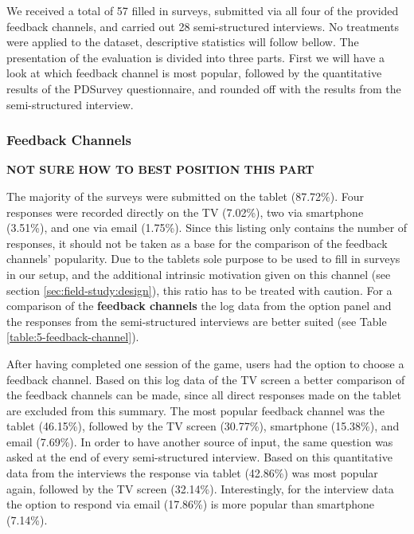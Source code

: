 	We received a total of 57 filled in surveys, submitted via all four of the provided feedback channels, and carried out 28 semi-structured interviews. 
	No treatments were applied to the dataset, descriptive statistics will follow bellow. The presentation of the evaluation is divided into three parts. First we will have a look at which feedback channel is most popular, followed by the quantitative results of the PDSurvey questionnaire, and rounded off with the results from the semi-structured interview. 



	\subsubsection{Feedback Channels}
	\label{5:results:feedback-channels}
	\label{5:results:feedback-channel}

	\textbf{NOT SURE HOW TO BEST POSITION THIS PART}

	The majority of the surveys were submitted on the tablet (87.72\%). Four responses were recorded directly on the TV (7.02\%), two via smartphone (3.51\%), and one via email (1.75\%). Since this listing only contains the number of responses, it should not be taken as a base for the comparison of the feedback channels' popularity. %
	Due to the tablets sole purpose to be used to fill in surveys in our setup, and the additional intrinsic motivation given on this channel (see section \ref{sec:field-study:design}), this ratio has to be treated with caution. For a comparison of the \textbf{feedback channels} the log data from the option panel and the responses from the semi-structured interviews are better suited (see Table \ref{table:5-feedback-channel}).


	After having completed one session of the game, users had the option to choose a feedback channel. Based on this log data of the TV screen a better comparison of the feedback channels can be made, since all direct responses made on the tablet are excluded from this summary. The most popular feedback channel was the tablet (46.15\%), followed by the TV screen (30.77\%), smartphone (15.38\%), and email (7.69\%).
	In order to have another source of input, the same question was asked at the end of every semi-structured interview. Based on this quantitative data from the interviews the response via tablet (42.86\%) was most popular again, followed by the TV screen (32.14\%). Interestingly, for the interview data the option to respond via email (17.86\%) is more popular than smartphone (7.14\%). 
		
